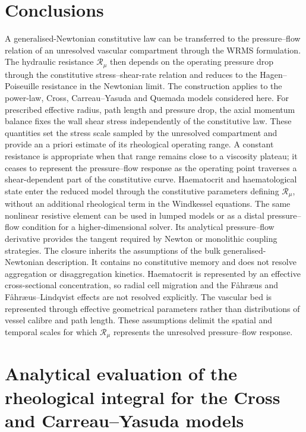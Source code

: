 \documentclass[lineno]{jfm}
\begin{document}
\section{Conclusions}
\label{sec:conclusions}
A generalised-Newtonian constitutive law can be transferred to the
pressure--flow relation of an unresolved vascular compartment through the
WRMS formulation. The hydraulic resistance $\mathcal{R}_{\mu}$ then depends
on the operating pressure drop through the constitutive stress--shear-rate
relation and reduces to the Hagen--Poiseuille resistance in the Newtonian
limit. The construction applies to the power-law, Cross, Carreau--Yasuda and
Quemada models considered here.
For prescribed effective radius, path length and pressure drop, the axial
momentum balance fixes the wall shear stress independently of the constitutive
law. These quantities set the stress scale sampled by the unresolved
compartment and provide an a priori estimate of its rheological operating
range. A constant resistance is appropriate when that range remains close to
a viscosity plateau; it ceases to represent the pressure--flow response as the
operating point traverses a shear-dependent part of the constitutive curve.
Haematocrit and haematological state enter the reduced model through the
constitutive parameters defining $\mathcal{R}_{\mu}$, without an additional
rheological term in the Windkessel equations. The same nonlinear resistive
element can be used in lumped models or as a distal pressure--flow condition
for a higher-dimensional solver. Its analytical pressure--flow derivative
provides the tangent required by Newton or monolithic coupling strategies.
The closure inherits the assumptions of the bulk generalised-Newtonian
description. It contains no constitutive memory and does not resolve
aggregation or disaggregation kinetics. Haematocrit is represented by an
effective cross-sectional concentration, so radial cell migration and the
F\aa hr\ae us and F\aa hr\ae us--Lindqvist effects are not resolved
explicitly. The vascular bed is represented through effective geometrical
parameters rather than distributions of vessel calibre and path length.
These assumptions delimit the spatial and temporal scales for which
$\mathcal{R}_{\mu}$ represents the unresolved pressure--flow response.
\appendix
\section{Analytical evaluation of the rheological integral for the Cross and
Carreau--Yasuda models}
\label{appA}
\end{document}
